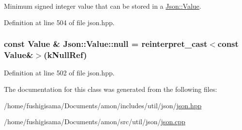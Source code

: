 Minimum signed integer value that can be stored in a \hyperlink{class_json_1_1_value}{Json\-::\-Value}. 



Definition at line 504 of file json.\-hpp.

\hypertarget{class_json_1_1_value_a6d6e9ea6807e46d5b7ded66d3032f607}{
\subsubsection[{null}]{\setlength{\rightskip}{0pt plus 5cm}const {\bf Value} \& Json\-::\-Value\-::null = reinterpret\-\_\-cast$<$const {\bf Value}\&$>$({\bf k\-Null\-Ref})\hspace{0.3cm}{\ttfamily [static]}}}\label{class_json_1_1_value_a6d6e9ea6807e46d5b7ded66d3032f607}


Definition at line 502 of file json.\-hpp.



The documentation for this class was generated from the following files\-:\begin{DoxyCompactItemize}
\item 
/home/fushigisama/\-Documents/amon/includes/util/json/\hyperlink{json_8hpp}{json.\-hpp}\item 
/home/fushigisama/\-Documents/amon/src/util/json/\hyperlink{json_8cpp}{json.\-cpp}\end{DoxyCompactItemize}

